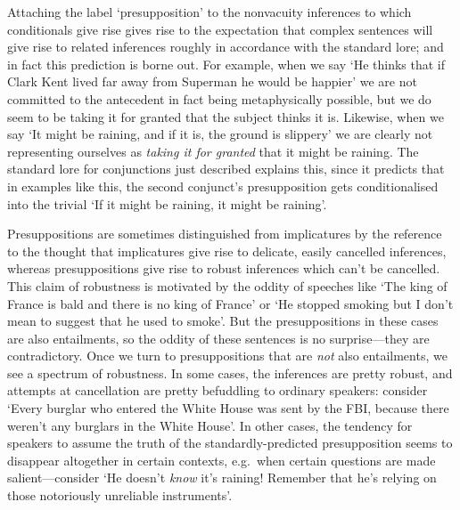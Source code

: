 \documentclass[If.tex]{subfiles}
\begin{document}
Attaching the label ‘presupposition’ to the nonvacuity inferences to which conditionals give rise gives rise to the expectation that complex sentences will give rise to related inferences roughly in accordance with the standard lore; and in fact this prediction is borne out.  For example, when we say ‘He thinks that if Clark Kent lived far away from Superman he would be happier’ we are not committed to the antecedent in fact being metaphysically possible, but we do seem to be taking it for granted that the subject thinks it is.  Likewise, when we say ‘It might be raining, and if it is, the ground is slippery’ we are clearly not representing ourselves as \emph{taking it for granted} that it might be raining. The standard lore for conjunctions just described explains this, since it predicts that in examples like this, the second conjunct's presupposition gets conditionalised into the trivial ‘If it might be raining, it might be raining’.

Presuppositions are sometimes distinguished from implicatures by the reference to the thought that implicatures give rise to delicate, easily cancelled inferences, whereas presuppositions give rise to robust inferences which can't be cancelled.  This claim of robustness is motivated by the oddity of speeches like ‘The king of France is bald and there is no king of France’ or ‘He stopped smoking but I don't mean to suggest that he used to smoke’.  But the presuppositions in these cases are also entailments, so the oddity of these sentences is no surprise---they are contradictory.  Once we turn to presuppositions that are \emph{not} also entailments, we see a spectrum of robustness.  In some cases, the inferences are pretty robust, and attempts at cancellation are pretty befuddling to ordinary speakers: consider ‘Every burglar who entered the White House was sent by the FBI, because there weren't any burglars in the White House’.  In other cases, the tendency for speakers to assume the truth of the standardly-predicted presupposition seems to disappear altogether in certain contexts, e.g.\ when certain questions are made salient---consider ‘He doesn't \emph{know} it's raining! Remember that he's relying on those notoriously unreliable instruments’.

\end{document}
